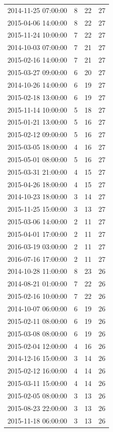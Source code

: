 \begin{tabular}{lrrr}
2014-11-25 07:00:00 & 8 & 22 & 27 \\
2015-04-06 14:00:00 & 8 & 22 & 27 \\
2015-11-24 10:00:00 & 7 & 22 & 27 \\
2014-10-03 07:00:00 & 7 & 21 & 27 \\
2015-02-16 14:00:00 & 7 & 21 & 27 \\
2015-03-27 09:00:00 & 6 & 20 & 27 \\
2014-10-26 14:00:00 & 6 & 19 & 27 \\
2015-02-18 13:00:00 & 6 & 19 & 27 \\
2015-11-14 10:00:00 & 5 & 18 & 27 \\
2015-01-21 13:00:00 & 5 & 16 & 27 \\
2015-02-12 09:00:00 & 5 & 16 & 27 \\
2015-03-05 18:00:00 & 4 & 16 & 27 \\
2015-05-01 08:00:00 & 5 & 16 & 27 \\
2015-03-31 21:00:00 & 4 & 15 & 27 \\
2015-04-26 18:00:00 & 4 & 15 & 27 \\
2014-10-23 18:00:00 & 3 & 14 & 27 \\
2015-11-25 15:00:00 & 3 & 13 & 27 \\
2015-03-06 14:00:00 & 2 & 11 & 27 \\
2015-04-01 17:00:00 & 2 & 11 & 27 \\
2016-03-19 03:00:00 & 2 & 11 & 27 \\
2016-07-16 17:00:00 & 2 & 11 & 27 \\
2014-10-28 11:00:00 & 8 & 23 & 26 \\
2014-08-21 01:00:00 & 7 & 22 & 26 \\
2015-02-16 10:00:00 & 7 & 22 & 26 \\
2014-10-07 06:00:00 & 6 & 19 & 26 \\
2015-02-11 08:00:00 & 6 & 19 & 26 \\
2015-03-08 08:00:00 & 6 & 19 & 26 \\
2015-02-04 12:00:00 & 4 & 16 & 26 \\
2014-12-16 15:00:00 & 3 & 14 & 26 \\
2015-02-12 16:00:00 & 4 & 14 & 26 \\
2015-03-11 15:00:00 & 4 & 14 & 26 \\
2015-02-05 08:00:00 & 3 & 13 & 26 \\
2015-08-23 22:00:00 & 3 & 13 & 26 \\
2015-11-18 06:00:00 & 3 & 13 & 26 \\

\end{tabular}
